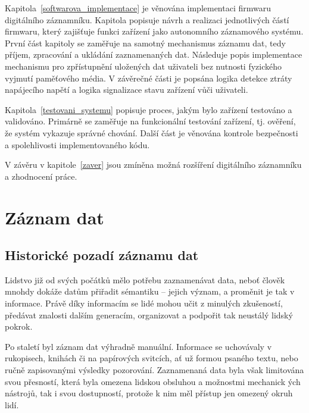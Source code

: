 Kapitola~\ref{softwarova_implementace} je věnována implementaci firmwaru digitálního záznamníku. Kapitola popisuje návrh a realizaci jednotlivých částí firmwaru, který zajišťuje funkci zařízení jako autonomního záznamového systému. První část kapitoly se zaměřuje na samotný mechanismus záznamu dat, tedy příjem, zpracování a ukládání zaznamenaných dat. Následuje popis implementace mechanismu pro zpřístupnění uložených dat uživateli bez nutnosti fyzického vyjmutí paměťového média. V závěrečné části je popsána logika detekce ztráty napájecího napětí a logika signalizace stavu zařízení vůči uživateli.

Kapitola~\ref{testovani_systemu} popisuje proces, jakým bylo zařízení testováno a validováno. Primárně se zaměřuje na funkcionální testování zařízení, tj. ověření, že systém vykazuje správné chování. Další část je věnována kontrole bezpečnosti a spolehlivosti implementovaného kódu.

V závěru v kapitole~\ref{zaver} jsou zmíněna možná rozšíření digitálního záznamníku a zhodnocení práce.

\chapter{Záznam dat}
\label{zaznam_dat}

\section{Historické pozadí záznamu dat}
\label{pocatky}
Lidstvo již od svých počátků mělo potřebu zaznamenávat data, neboť člověk mnohdy dokáže datům přiřadit sémantiku -- jejich význam, a proměnit je tak v informace. Právě díky informacím se lidé mohou učit z minulých zkušeností, předávat znalosti dalším generacím, organizovat a podpořit tak neustálý lidský pokrok. 

Po staletí byl záznam dat výhradně manuální. Informace se uchovávaly v rukopisech, knihách či na papírových svitcích, ať už formou psaného textu, nebo ručně zapisovanými výsledky pozorování. Zaznamenaná data byla však limitována svou přesností, která byla omezena lidskou obsluhou a možnostmi mechanick  ých nástrojů, tak i svou dostupností, protože k nim měl přístup jen omezený okruh lidí.



